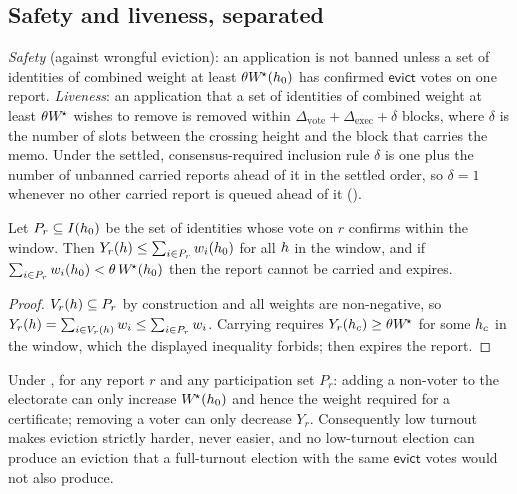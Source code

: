 \subsection{Safety and liveness, separated}
\label{sec:23:safety}

\begin{definition}
\label{def:23:safety-liveness}
\emph{Safety} (against wrongful eviction): an application is not banned unless a set of identities
of combined weight at least $\theta W^{\!\star}(h_0)$ has confirmed $\mathsf{evict}$ votes
on one report. \emph{Liveness}: an application that a set of identities of combined weight at least
$\theta W^{\!\star}$ wishes to remove is removed within
$\Delta_{\mathrm{vote}} + \Delta_{\mathrm{exec}} + \delta$ blocks, where $\delta$ is the number of
slots between the crossing height and the block that carries the memo. Under the settled,
consensus-required inclusion rule $\delta$ is one plus the number of unbanned carried reports ahead
of it in the settled order, so $\delta = 1$ whenever no other carried report is queued ahead of
it ().
\end{definition}

\begin{lemma}
\label{lem:23:turnout}
Let $P_r \subseteq I(h_0)$ be the set of identities whose vote on $r$ confirms within the window.
Then $Y_r(h) \le \sum_{i \in P_r} w_{i}(h_0)$ for all $h$ in the window, and if
$\sum_{i \in P_r} w_{i}(h_0) < \theta\,W^{\!\star}(h_0)$ then the report cannot
be carried and expires.
\end{lemma}

\begin{proof}
$V_r(h) \subseteq P_r$ by construction and all weights are non-negative, so
$Y_r(h) = \sum_{i \in V_r(h)} w_{i} \le \sum_{i \in P_r} w_{i}$. Carrying requires
$Y_r(h_c) \ge \theta W^{\!\star}$ for some $h_c$ in the window, which the displayed
inequality forbids;  then expires the report.
\end{proof}

\begin{theorem}
\label{thm:23:turnout}
Under , for any report $r$ and any participation set $P_r$: adding a
non-voter to the electorate can only increase $W^{\!\star}(h_0)$ and hence the weight
required for a certificate; removing a voter can only decrease $Y_r$. Consequently low turnout
makes eviction strictly harder, never easier, and no low-turnout election can produce an eviction
that a full-turnout election with the same $\mathsf{evict}$ votes would not also produce.
\end{theorem}


